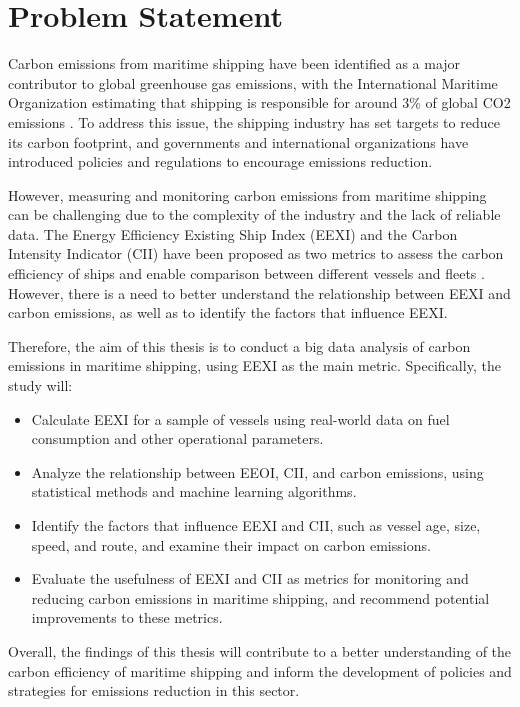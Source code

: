 \section{Problem Statement}

Carbon emissions from maritime shipping have been identified as a major contributor to global greenhouse gas emissions, with the International Maritime Organization estimating that shipping is responsible for around 3\% of global CO2 emissions \autocite{king_anthony_2022}.
To address this issue, the shipping industry has set targets to reduce its carbon footprint, and governments and international organizations have introduced policies and regulations to encourage emissions reduction.

However, measuring and monitoring carbon emissions from maritime shipping can be challenging due to the complexity of the industry and the lack of reliable data.
The Energy Efficiency Existing Ship Index (EEXI) and the Carbon Intensity Indicator (CII) have been proposed as two metrics to assess the carbon efficiency of ships and enable comparison between different vessels and fleets \autocite{ZHANG2019118223,CHUAH2023115348}.
However, there is a need to better understand the relationship between EEXI and carbon emissions, as well as to identify the factors that influence EEXI.

Therefore, the aim of this thesis is to conduct a big data analysis of carbon emissions in maritime shipping, using EEXI as the main metric. Specifically, the study will:

\begin{itemize}
    \item Calculate EEXI for a sample of vessels using real-world data on fuel consumption and other operational parameters.
    \item Analyze the relationship between EEOI, CII, and carbon emissions, using statistical methods and machine learning algorithms.
    \item Identify the factors that influence EEXI and CII, such as vessel age, size, speed, and route, and examine their impact on carbon emissions.
    \item Evaluate the usefulness of EEXI and CII as metrics for monitoring and reducing carbon emissions in maritime shipping, and recommend potential improvements to these metrics.
\end{itemize}


Overall, the findings of this thesis will contribute to a better understanding of the carbon efficiency of maritime shipping and inform the development of policies and strategies for emissions reduction in this sector.
